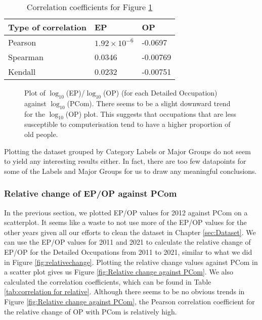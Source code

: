 \documentclass[11pt]{article}
\begin{document}
\begin{table}[]
	\centering
	\begin{tabular}{l|ll|ll}
	\textbf{Type of correlation} & \multicolumn{2}{l|}{\textbf{EP}} & \multicolumn{2}{l}{\textbf{OP}} \\ \hline
	Pearson                      & \multicolumn{2}{l|}{$1.92\times10^{-6}$}     & \multicolumn{2}{l}{-0.0697}      \\ \hline
	Spearman                     & \multicolumn{2}{l|}{0.0346}      & \multicolumn{2}{l}{-0.00769}    \\ \hline
	Kendall                      & \multicolumn{2}{l|}{0.0232}      & \multicolumn{2}{l}{-0.00751}   
	\end{tabular}
	\caption{Correlation coefficients for Figure \ref{fig:logEP/OP against PCom}}
	\label{tab:logcorrelation}
	\end{table}


\begin{figure}[!htb]
	\centering
	\hfill
	\hfill
	\caption{Plot of $\log_{10}$(EP)/$\log_{10}$(OP) (for each Detailed Occupation) against $\log_{10}$(PCom). There seems to be a slight downward trend for the $\log_{10}$(OP) plot. This suggests that occupations that are less susceptible to computerisation tend to have a higher proportion of old people.}
	\label{fig:logEP/OP against PCom}
\end{figure}


Plotting the dataset grouped by Category Labels or Major Groups do not seem to yield any interesting results either. In fact, there are too few datapoints for some of the Labels and Major Groups for us to draw any meaningful conclusions.

\subsubsection*{Relative change of EP/OP against PCom}
In the previous section, we plotted EP/OP values for 2012 against PCom on a scatterplot. It seems like a waste to not use more of the EP/OP values for the other years given all our efforts to clean the dataset in Chapter \ref{sec:Dataset}. We can use the EP/OP values for 2011 and 2021 to calculate the relative change of EP/OP for the Detailed Occupations from 2011 to 2021, similar to what we did in Figure \ref{fig:relativechange}. Plotting the relative change values against PCom in a scatter plot gives us Figure \ref{fig:Relative change against PCom}. We also calculated the correlation coefficients, which can be found in Table \ref{tab:correlation for relative}. Although there seems to be no obvious trends in Figure \ref{fig:Relative change against PCom}, the Pearson correlation coefficient for the relative change of OP with PCom is relatively high.
\end{document}
